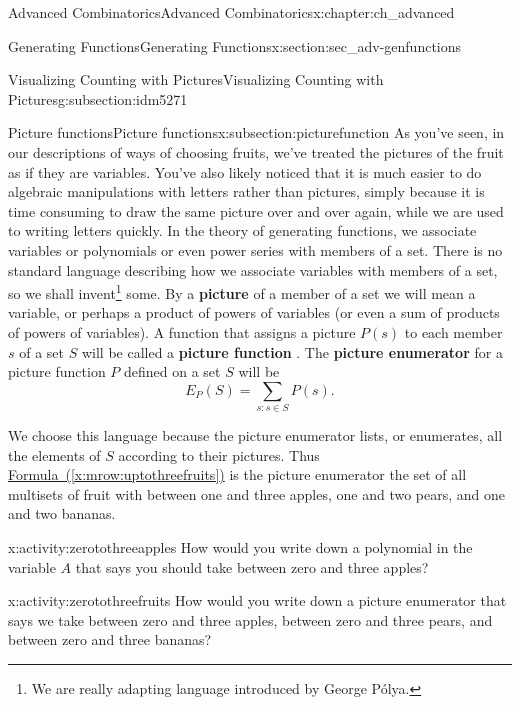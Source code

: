 \documentclass[oneside,10pt,]{book}
\newcommand{\terminology}[1]{\textbf{#1}}
\numberwithin{equation}{chapter}
\begin{document}
\begin{chapterptx}{Advanced Combinatorics}{}{Advanced Combinatorics}{}{}{x:chapter:ch_advanced}
\begin{sectionptx}{Generating Functions}{}{Generating Functions}{}{}{x:section:sec_adv-genfunctions}
\begin{subsectionptx}{Visualizing Counting with Pictures}{}{Visualizing Counting with Pictures}{}{}{g:subsection:idm5271}
\end{subsectionptx}
%
%
\typeout{************************************************}
\typeout{************************************************}
%
\begin{subsectionptx}{Picture functions}{}{Picture functions}{}{}{x:subsection:picturefunction}
As you've seen, in our descriptions of ways of choosing fruits, we've treated the pictures of the fruit as if they are variables. You've also likely noticed that it is much easier to do algebraic manipulations with letters rather than pictures, simply because it is time consuming to draw the same picture over and over again, while we are used to writing letters quickly. In the theory of generating functions, we associate variables or polynomials or even power series with members of a set. There is no standard language describing how we associate variables with members of a set, so we shall invent\footnote{We are really adapting language introduced by George Pólya.\label{g:fn:idm5342}} some. By a \terminology{picture} of a member of a set we will mean a variable, or perhaps a product of powers of variables (or even a sum of products of powers of variables). A function that assigns a picture \(P(s)\) to each member \(s\) of a set \(S\) will be called a \terminology{picture function} . The \terminology{picture enumerator} for a picture function \(P\) defined on a set \(S\) will be%
\begin{equation*}
E_P(S) = \sum_{s: s\in S}  P(s).
\end{equation*}
%
\par
We choose this language because the picture enumerator lists, or enumerates, all the elements of \(S\) according to their pictures. Thus \hyperref[x:mrow:uptothreefruits]{Formula~(\ref{x:mrow:uptothreefruits})} is the picture enumerator the set of all multisets of fruit with between one and three apples, one and two pears, and one and two bananas.%
\begin{activity}{}{x:activity:zerotothreeapples}%
How would you write down a polynomial in the variable \(A\) that says you should take between zero and three apples?%
\end{activity}
\begin{activity}{}{x:activity:zerotothreefruits}%
How would you write down a picture enumerator that says we take between zero and three apples, between zero and three pears, and between zero and three bananas?%
\end{activity}

\end{subsectionptx}
\end{sectionptx}
\end{chapterptx}
\end{document}
